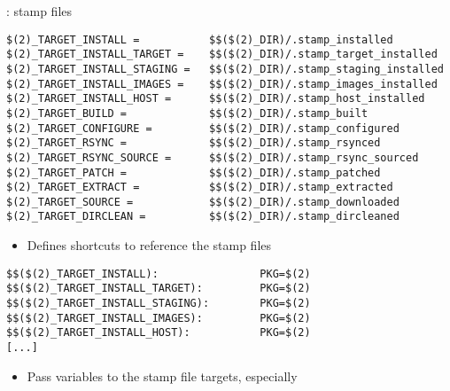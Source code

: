 \begin{frame}[fragile]{: stamp files}

\begin{block}{}
\begin{verbatim}
$(2)_TARGET_INSTALL =           $$($(2)_DIR)/.stamp_installed
$(2)_TARGET_INSTALL_TARGET =    $$($(2)_DIR)/.stamp_target_installed
$(2)_TARGET_INSTALL_STAGING =   $$($(2)_DIR)/.stamp_staging_installed
$(2)_TARGET_INSTALL_IMAGES =    $$($(2)_DIR)/.stamp_images_installed
$(2)_TARGET_INSTALL_HOST =      $$($(2)_DIR)/.stamp_host_installed
$(2)_TARGET_BUILD =             $$($(2)_DIR)/.stamp_built
$(2)_TARGET_CONFIGURE =         $$($(2)_DIR)/.stamp_configured
$(2)_TARGET_RSYNC =             $$($(2)_DIR)/.stamp_rsynced
$(2)_TARGET_RSYNC_SOURCE =      $$($(2)_DIR)/.stamp_rsync_sourced
$(2)_TARGET_PATCH =             $$($(2)_DIR)/.stamp_patched
$(2)_TARGET_EXTRACT =           $$($(2)_DIR)/.stamp_extracted
$(2)_TARGET_SOURCE =            $$($(2)_DIR)/.stamp_downloaded
$(2)_TARGET_DIRCLEAN =          $$($(2)_DIR)/.stamp_dircleaned
\end{verbatim}
\end{block}

\begin{itemize}
\item Defines shortcuts to reference the stamp files
\end{itemize}

\begin{block}{}
\begin{verbatim}
$$($(2)_TARGET_INSTALL):                PKG=$(2)
$$($(2)_TARGET_INSTALL_TARGET):         PKG=$(2)
$$($(2)_TARGET_INSTALL_STAGING):        PKG=$(2)
$$($(2)_TARGET_INSTALL_IMAGES):         PKG=$(2)
$$($(2)_TARGET_INSTALL_HOST):           PKG=$(2)
[...]
\end{verbatim}
\end{block}

\begin{itemize}
\item Pass variables to the stamp file targets, especially 
\end{itemize}

\end{frame}

